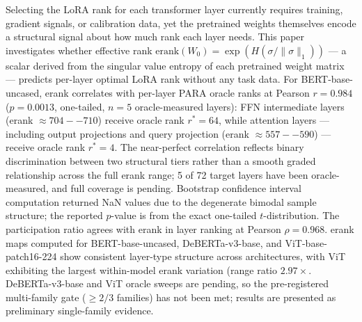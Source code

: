 
Selecting the LoRA rank for each transformer layer currently requires training, gradient signals, or calibration data, yet the pretrained weights themselves encode a structural signal about how much rank each layer needs. This paper investigates whether effective rank $\text{erank}(W_0) = \exp(H(\sigma/\|\sigma\|_1))$ --- a scalar derived from the singular value entropy of each pretrained weight matrix --- predicts per-layer optimal LoRA rank without any task data. For BERT-base-uncased, erank correlates with per-layer PARA oracle ranks at Pearson $r = 0.984$ ($p = 0.0013$, one-tailed, $n = 5$ oracle-measured layers): FFN intermediate layers (erank $\approx 704--710$) receive oracle rank $r^* = 64$, while attention layers --- including output projections and query projection (erank $\approx 557--590$) --- receive oracle rank $r^* = 4$. The near-perfect correlation reflects binary discrimination between two structural tiers rather than a smooth graded relationship across the full erank range; 5 of 72 target layers have been oracle-measured, and full coverage is pending. Bootstrap confidence interval computation returned NaN values due to the degenerate bimodal sample structure; the reported $p$-value is from the exact one-tailed $t$-distribution. The participation ratio agrees with erank in layer ranking at Pearson $\rho = 0.968$. erank maps computed for BERT-base-uncased, DeBERTa-v3-base, and ViT-base-patch16-224 show consistent layer-type structure across architectures, with ViT exhibiting the largest within-model erank variation (range ratio $2.97\times$. DeBERTa-v3-base and ViT oracle sweeps are pending, so the pre-registered multi-family gate ($\geq 2/3$ families) has not been met; results are presented as preliminary single-family evidence.

